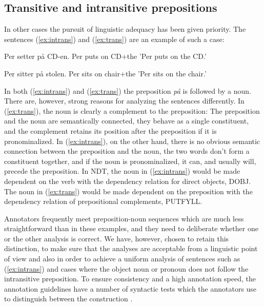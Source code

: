 \documentclass[11pt,a4paper]{article}
\begin{document}
\subsection{Transitive and intransitive prepositions}
In other cases the pursuit of linguistic adequacy has been given priority. The sentences (\ref{ex:intrans}) and (\ref{ex:trans}) are an example of such a case:

\begin{examples}
\item\label{ex:intrans}
\gll Per setter på CD-en.
Per puts on CD+the
\glt 'Per puts on the CD.'
\glend

\item\label{ex:trans}
\gll Per sitter på stolen.
Per sits on chair+the
\glt 'Per sits on the chair.'
\glend
\end{examples}

In both (\ref{ex:intrans}) and (\ref{ex:trans}) the preposition \emph{på} is followed by a noun. There are, however, strong reasons for analyzing the sentences differently. In (\ref{ex:trans}), the noun is clearly a complement to the preposition: The preposition and the noun are semantically connected, they behave as a single constituent, and the complement retains its position after the preposition if it is pronominalized. In (\ref{ex:intrans}), on the other hand, there is no obvious semantic connection between the preposition and the noun, the two words don't form a constituent together, and if the noun is pronominalized, it can, and usually will, precede the preposition. In NDT, the noun in (\ref{ex:intrans}) would be made dependent on the verb with the dependency relation for direct objects, DOBJ. The noun in (\ref{ex:trans}) would be made dependent on the preposition with the dependency relation of prepositional complements, PUTFYLL.

Annotators frequently meet preposition-noun sequences which are much less straightforward than in these examples, and they need to deliberate whether one or the other analysis is correct. We have, however, chosen to retain this distinction, to make sure that the analyses are acceptable from a linguistic point of view and also in order to achieve a uniform analysis of sentences such as (\ref{ex:intrans}) and cases where the object noun or pronoun does not follow the intransitive preposition. To ensure consistency and a high annotation speed, the annotation guidelines have a number of syntactic tests which the annotators use to distinguish between the construction \cite[54-56]{Kin:Sol:Eri:2013}.
\end{document}
